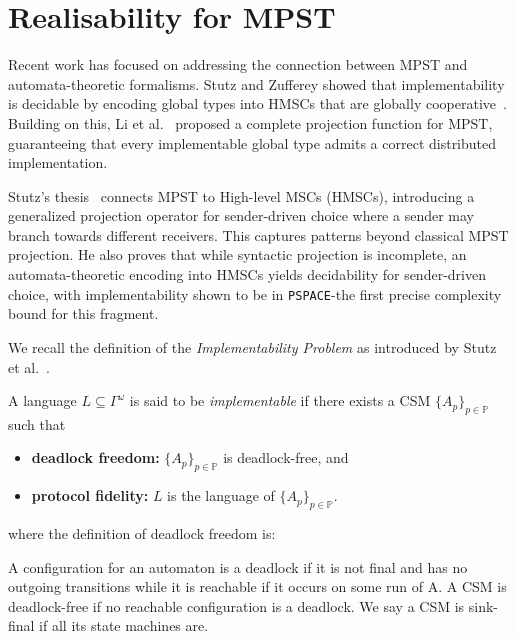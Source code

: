 \section{Realisability for MPST}

Recent work has focused on addressing the connection between MPST 
and automata-theoretic formalisms. Stutz and Zufferey 
showed that implementability is decidable by encoding global types 
into HMSCs that are globally cooperative~\cite{stutz2022comparing,stutz2023asynchronous}. 
Building on this, Li et al.~\cite{li2023complete} proposed a complete 
projection function for MPST, guaranteeing that every implementable 
global type admits a correct distributed implementation.

Stutz’s thesis~\cite{stutz2024implementability} connects MPST to 
High-level MSCs (HMSCs), introducing a generalized projection operator 
for sender-driven choice where a sender may branch towards different 
receivers. This captures patterns beyond classical MPST projection.  
He also proves that while syntactic projection is incomplete, 
an automata-theoretic encoding into HMSCs yields decidability for 
sender-driven choice, with implementability shown to be in 
\verb|PSPACE|-the first precise complexity bound for this fragment.

We recall the definition of the \emph{Implementability Problem} as 
introduced by Stutz et al.~\cite{stutz2024implementability}.  

\bigskip

\begin{definition}
A language $L \subseteq \Gamma^\omega$ is said to be 
\emph{implementable} if there exists a CSM 
$\{A_p\}_{p \in \mathbb{P}}$ such that
\begin{itemize}
    \item \textbf{deadlock freedom:} 
    $\{A_p\}_{p \in \mathbb{P}}$ is deadlock-free, and
    \item \textbf{protocol fidelity:} 
    $L$ is the language of $\{A_p\}_{p \in \mathbb{P}}$.
\end{itemize}
\end{definition}

where the definition of deadlock freedom is:

\bigskip

\begin{definition}
A configuration for an automaton is a deadlock if it is not final and  
has no outgoing transitions while it is reachable if it occurs on some 
run of A. A CSM is deadlock-free if no reachable configuration is a
deadlock. We say a CSM is sink-final if all its state machines are.
\end{definition}

